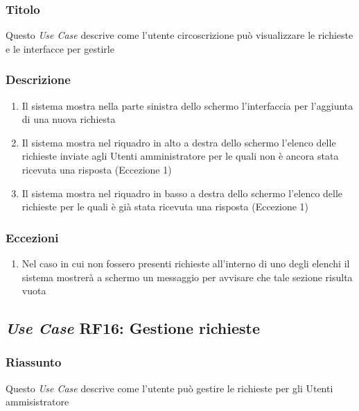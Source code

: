         \subsubsection{Titolo}
            Questo \textit{Use Case} descrive come l'utente circoscrizione può visualizzare le richieste e le interfacce per gestirle
        \subsubsection{Descrizione}
            \begin{enumerate}
                \item Il sistema mostra nella parte sinistra dello schermo l'interfaccia per l'aggiunta di una nuova richiesta
                \item Il sistema mostra nel riquadro in alto a destra dello schermo l'elenco delle richieste inviate agli Utenti amministratore per le quali non è ancora stata ricevuta una risposta (Eccezione 1)
                \item Il sistema mostra nel riquadro in basso a destra dello schermo l'elenco delle richieste per le quali è già stata ricevuta una risposta (Eccezione 1)
            \end{enumerate}
        \subsubsection{Eccezioni}
            \begin{enumerate}
                \item Nel caso in cui non fossero presenti richieste all'interno di uno degli elenchi il sistema mostrerà a schermo un messaggio per avvisare che tale sezione risulta vuota
            \end{enumerate}

    \subsection{\textit{Use Case} RF16: Gestione richieste}
        \subsubsection{Riassunto}
            Questo \textit{Use Case} descrive come l'utente può gestire le richieste per gli Utenti ammisistratore
